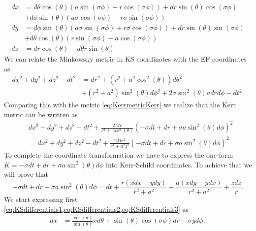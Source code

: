\begin{Proof}
\begin{align}
dx&=d\theta \cos (\theta ) (a \sin ( \sigma\phi  )+r  \cos ( \sigma\phi  ))+dr  \sin (\theta ) \cos (\sigma\phi ) \nonumber \\
&+d\phi \sin (\theta ) (a \sigma  \cos (\sigma  \phi )-r \sigma  \sin (\sigma  \phi )) \label{eq:KSdifferentials1}\\
dy&=d\phi \sin (\theta ) (a \sigma  \sin (\sigma  \phi )+r \sigma  \cos (\sigma  \phi ))+dr  \sin (\theta ) \sin (\sigma \phi )\nonumber \\
&+d\theta \cos (\theta ) (r  \sin (\sigma \phi )-a \cos (\sigma \phi ))\label{eq:KSdifferentials2} \\
dz&=dr\cos (\theta )-d\theta r \sin (\theta )\label{eq:KSdifferentials3}
\end{align}
We can relate the Minkowsky metric in \gls{KS} coordinates with the \gls{EF} coordinates as
\begin{equation}
\begin{aligned}
 dx^2+dy^2+dz^2-dt^2&= dr^2 + (r^2 +a^2 \cos^2{(\theta)} ) d\theta^2\\
 &+ (r^2+a^2)\sin^2{(\theta)} d\phi^2+2 \sigma \sin^2{(\theta)} a dr d\phi -dt^2.
\end{aligned}
\end{equation}
Comparing this with the metric \cref{eq:KerrmetricKerr} we realize that the Kerr metric can be written as
\begin{equation}
\begin{aligned}
 &dx^2+dy^2+dz^2-dt^2+\frac{2 M r}{r^2+\cos^2{(\theta)}} (-\sigma dt+ dr+\sigma a \sin^2{(\theta)} d\phi)^2\\
 &=dx^2+dy^2+dz^2-dt^2+\frac{2 M r^3}{r^4+a^2 z^2} (-\sigma dt+ dr+\sigma a \sin^2{(\theta)} d\phi)^2
 \end{aligned}
\end{equation}
To complete the coordinate transformation we have to express the one-form $K=-\sigma dt+dr+\sigma a \sin^2{(\theta)} d\phi$ into Kerr-Schild coordinates. To achieve that we will prove that
\begin{equation}
 -\sigma dt+dr+ \sigma a \sin^2{(\theta)} d\phi= dt + \frac{r(x dx+y dy)}{r^2+a^2} + \frac{a(x dy-y dx)}{r^2+a^2}+\frac{z dz}{r}.
\end{equation}
We start expressing first \cref{eq:KSdifferentials1,eq:KSdifferentials2,eq:KSdifferentials3} as
\begin{align}
 dx&=\frac{\cos{(\theta)}}{\sin{(\theta)}} x d\theta +\sin( \theta) \cos{(\sigma \phi)} dr-\sigma y d\phi,\\

\end{align}
\end{Proof}
